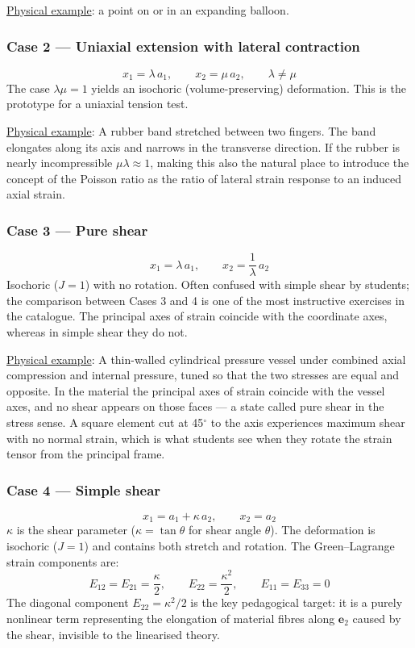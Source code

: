 \documentclass[11pt]{article}
\begin{document}
\uline{Physical example}: a point on or in an expanding balloon.
\subsubsection*{Case 2 — Uniaxial extension with lateral contraction}
\label{sec:org41a60f2}
\[
  x_1 = \lambda\, a_1, \qquad x_2 = \mu\, a_2, \qquad \lambda \neq \mu
\]
The case \(\lambda\mu = 1\) yields an isochoric (volume-preserving) deformation.  This is the prototype for a uniaxial tension test.  

\uline{Physical example}: A rubber band stretched between two fingers. The band elongates along its axis and narrows in the transverse direction. If the rubber is nearly incompressible \(\mu \lambda \approx 1\), making this also the natural place to introduce the concept of the Poisson ratio as the ratio of lateral strain response to an induced axial strain.
\subsubsection*{Case 3 — Pure shear}
\label{sec:org23bbd16}
\[
  x_1 = \lambda\, a_1, \qquad x_2 = \frac{1}{\lambda}\, a_2
\]
Isochoric (\(J = 1\)) with no rotation.  Often confused with simple
shear by students; the comparison between Cases 3 and 4 is one of the
most instructive exercises in the catalogue.  The principal axes of
strain coincide with the coordinate axes, whereas in simple shear they
do not.

\uline{Physical example}: A thin-walled cylindrical pressure vessel under combined axial compression and internal pressure, tuned so that the two stresses are equal and opposite. In the material the principal axes of strain coincide with the vessel axes, and no shear appears on those faces — a state called pure shear in the stress sense. A square element cut at 45\(^\circ\) to the axis experiences maximum shear with no normal strain, which is what students see when they rotate the strain tensor from the principal frame.
\subsubsection*{Case 4 — Simple shear}
\label{sec:org3077424}
\[
  x_1 = a_1 + \kappa\, a_2, \qquad x_2 = a_2
\]
\(\kappa\) is the shear parameter (\(\kappa = \tan\theta\) for shear angle
\(\theta\)).  The deformation is isochoric (\(J = 1\)) and contains both
stretch and rotation.  The Green--Lagrange strain components are:
\[
  E_{12} = E_{21} = \frac{\kappa}{2}, \qquad
  E_{22} = \frac{\kappa^2}{2}, \qquad
  E_{11} = E_{33} = 0
\]
The diagonal component \(E_{22} = \kappa^2/2\) is the key pedagogical
target: it is a purely nonlinear term representing the elongation of
material fibres along \(\mathbf{e}_2\) caused by the shear, invisible to
the linearised theory.
\end{document}
